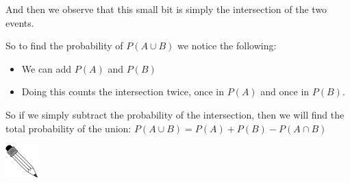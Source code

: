 And then we observe that this small bit is simply the intersection of the two events.\par \label{m39377*eip-609}So to find the probability of $P\left(A\cup B\right)$ we notice the following: \label{m39377*id9324}\begin{itemize}[noitemsep]
            \item We can add  $P\left(A\right)$ and  $P\left(B\right)$\item Doing this counts the intersection twice, once in $P\left(A\right)$ and once in $P\left(B\right)$.\end{itemize}
So if we simply subtract the probability of the intersection, then we will find the total probability of the union: 
$P\left(A\cup B\right)=P\left(A\right)+P\left(B\right)-P\left(A\cap B\right)$\par \par
            \label{m39377*secfhsst!!!underscore!!!id850}\vspace{.5cm} 
      \noindent
      \hspace*{-30pt}\includegraphics[width=0.5in]{col11306.imgs/pspencil2.png}   
    \noindent
\label{m39377*secfhsst!!!underscore!!!id860}\vspace{.5cm} 
